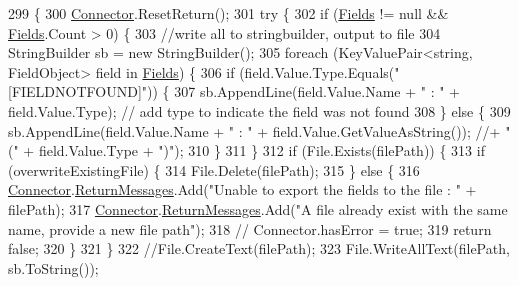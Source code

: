 \begin{DoxyCode}
299                                                                           \{
300         \mbox{\hyperlink{class_connector}{Connector}}.ResetReturn();
301         \textcolor{keywordflow}{try} \{
302             \textcolor{keywordflow}{if} (\mbox{\hyperlink{class_document_object_ae203b8a3e40b6c428145d2335b71245c}{Fields}} != null && \mbox{\hyperlink{class_document_object_ae203b8a3e40b6c428145d2335b71245c}{Fields}}.Count > 0) \{
303                 \textcolor{comment}{//write all to stringbuilder, output to file}
304                 StringBuilder sb = \textcolor{keyword}{new} StringBuilder();
305                 \textcolor{keywordflow}{foreach} (KeyValuePair<string, FieldObject> field \textcolor{keywordflow}{in} \mbox{\hyperlink{class_document_object_ae203b8a3e40b6c428145d2335b71245c}{Fields}}) \{
306                     \textcolor{keywordflow}{if} (field.Value.Type.Equals(\textcolor{stringliteral}{"[FIELDNOTFOUND]"})) \{
307                         sb.AppendLine(field.Value.Name + \textcolor{stringliteral}{" : "} + field.Value.Type); \textcolor{comment}{// add type to indicate
       the field was not found}
308                     \} \textcolor{keywordflow}{else} \{
309                         sb.AppendLine(field.Value.Name + \textcolor{stringliteral}{" : "} + field.Value.GetValueAsString()); \textcolor{comment}{//+ " ("
       + field.Value.Type + ")");}
310                     \}
311                 \}
312                 \textcolor{keywordflow}{if} (File.Exists(filePath)) \{
313                     \textcolor{keywordflow}{if} (overwriteExistingFile) \{
314                         File.Delete(filePath);
315                     \} \textcolor{keywordflow}{else} \{
316                         \mbox{\hyperlink{class_connector}{Connector}}.\mbox{\hyperlink{class_connector_a1ed422674b344524fd77998dcf6a9ba6}{ReturnMessages}}.Add(\textcolor{stringliteral}{"Unable to export the fields to
       the file : "} + filePath);
317                         \mbox{\hyperlink{class_connector}{Connector}}.\mbox{\hyperlink{class_connector_a1ed422674b344524fd77998dcf6a9ba6}{ReturnMessages}}.Add(\textcolor{stringliteral}{"A file already exist with the
       same name, provide a new file path"});
318                         \textcolor{comment}{// Connector.hasError = true;}
319                         \textcolor{keywordflow}{return} \textcolor{keyword}{false};
320                     \}
321                 \}
322                 \textcolor{comment}{//File.CreateText(filePath);}
323                 File.WriteAllText(filePath, sb.ToString());

\end{DoxyCode}
